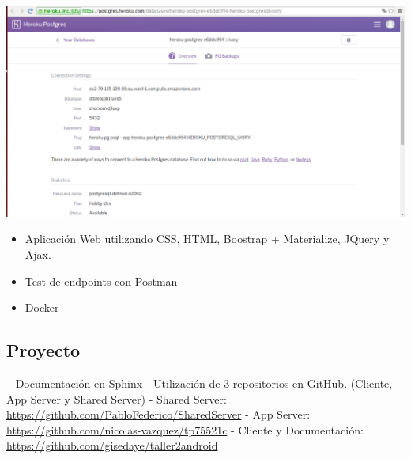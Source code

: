 \documentclass[letterpaper,10pt,english]{sphinxmanual}
\begin{document}
\includegraphics{postgresql.png}
\begin{itemize}
\item {} 
Aplicación Web utilizando CSS, HTML, Boostrap + Materialize, JQuery y Ajax.

\item {} 
Test  de endpoints con Postman

\item {} 
Docker

\end{itemize}


\subsection{Proyecto}
\label{manuals:proyecto}
-- Documentación en Sphinx
- Utilización de 3 repositorios en GitHub. (Cliente, App Server y Shared Server)
- Shared Server: \href{https://github.com/PabloFederico/SharedServer}{https://github.com/PabloFederico/SharedServer}
- App Server: \href{https://github.com/nicolas-vazquez/tp75521c}{https://github.com/nicolas-vazquez/tp75521c}
- Cliente y Documentación: \href{https://github.com/gisedaye/taller2android}{https://github.com/gisedaye/taller2android}
\end{document}
